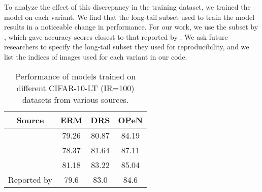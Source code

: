 To analyze the effect of this discrepancy in the training dataset, we trained the model on each variant. We find that the long-tail subset used to train the model results in a noticeable change in performance. For our work, we use the subset by \citet{LDAM-DRW}, which gave accuracy scores closest to that reported by \citet{PureNoise}. We ask future researchers to specify the long-tail subset they used for reproducibility, and we list the indices of images used for each variant in our code.

\begin{table}[!ht]
    \centering
    \begin{tabular}{c|ccc}
        Source & ERM & DRS & OPeN \\ \hline
        \citet{ClassBalancedLoss} & 79.26 & 80.87 & 84.19 \\
        \citet{M2m} & 78.37 & 81.64 & 87.11 \\
        \citet{LDAM-DRW} & 81.18 & 83.22 & 85.04 \\
        \hline
        Reported by \citet{PureNoise} & 79.6 & 83.0 & 84.6 \\
    \end{tabular}
    \caption{Performance of models trained on different CIFAR-10-LT (IR=100) datasets from various sources.}
    \label{tab:cifar10_indices_perf}
\end{table}






